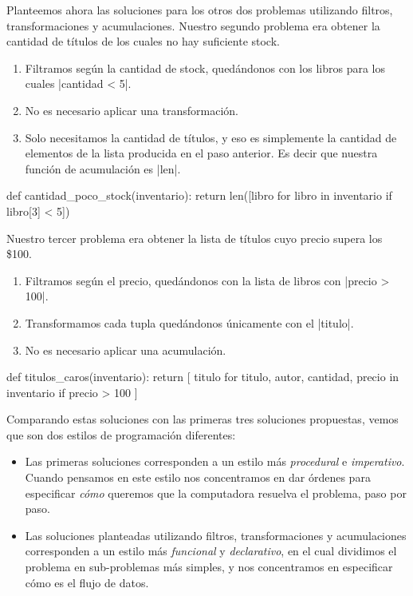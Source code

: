 \begin{subappendices}
Planteemos ahora las soluciones para los otros dos problemas utilizando
filtros, transformaciones y acumulaciones. Nuestro segundo problema era obtener
la cantidad de títulos de los cuales no hay suficiente stock.

\begin{enumerate}
    \item Filtramos según la cantidad de stock, quedándonos con los libros
        para los cuales |cantidad < 5|.
    \item No es necesario aplicar una transformación.
    \item Solo necesitamos la cantidad de títulos, y eso es simplemente la
        cantidad de elementos de la lista producida en el paso anterior. Es
        decir que nuestra función de acumulación es |len|.
\end{enumerate}

\begin{codigo-python-sn}
def cantidad_poco_stock(inventario):
    return len([libro for libro in inventario if libro[3] < 5])
\end{codigo-python-sn}

Nuestro tercer problema era obtener la lista de títulos cuyo precio supera los
\$100.

\begin{enumerate}
    \item Filtramos según el precio, quedándonos con la lista de libros con
        |precio > 100|.
    \item Transformamos cada tupla quedándonos únicamente con el |titulo|.
    \item No es necesario aplicar una acumulación.
\end{enumerate}

\begin{codigo-python-sn}
def titulos_caros(inventario):
    return [
        titulo
        for titulo, autor, cantidad, precio in inventario
        if precio > 100
    ]
\end{codigo-python-sn}

Comparando estas soluciones con las primeras tres soluciones
propuestas, vemos que son dos estilos de programación diferentes:

\begin{itemize}
    \item Las primeras soluciones corresponden a un estilo más \emph{procedural} e
        \emph{imperativo}. Cuando pensamos en este estilo nos concentramos en
        dar órdenes para especificar \emph{cómo} queremos que la computadora
        resuelva el problema, paso por paso.
    \item Las soluciones planteadas utilizando filtros, transformaciones y
        acumulaciones corresponden a un estilo más \emph{funcional} y
        \emph{declarativo}, en el cual dividimos el problema en sub-problemas
        más simples, y nos concentramos en especificar cómo es el flujo de datos.
\end{itemize}


\end{subappendices}
